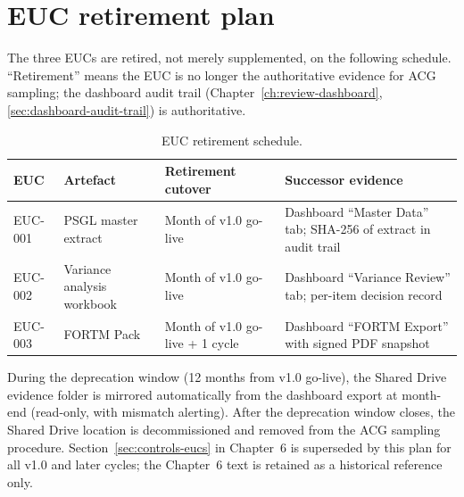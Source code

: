 \section{EUC retirement plan}\label{sec:euc-retirement-plan}

The three EUCs are retired, not merely supplemented, on the
following schedule. ``Retirement'' means the EUC is no longer the
authoritative evidence for ACG sampling; the dashboard audit trail
(Chapter~\ref{ch:review-dashboard}, \cref{sec:dashboard-audit-trail}) is authoritative.

\begin{table}[htbp]
\centering
\caption{EUC retirement schedule.}
\label{tab:euc-retirement}
\footnotesize
\begin{tabularx}{\linewidth}{@{}l l l X@{}}
\toprule
\textbf{EUC} & \textbf{Artefact} & \textbf{Retirement cutover} & \textbf{Successor evidence} \\ \midrule
EUC-001 & PSGL master extract & Month of v1.0 go-live & Dashboard ``Master Data'' tab; SHA-256 of extract in audit trail \\
EUC-002 & Variance analysis workbook & Month of v1.0 go-live & Dashboard ``Variance Review'' tab; per-item decision record \\
EUC-003 & FORTM Pack & Month of v1.0 go-live + 1 cycle & Dashboard ``FORTM Export'' with signed PDF snapshot \\
\bottomrule
\end{tabularx}
\end{table}

\noindent
During the deprecation window (12 months from v1.0 go-live), the
Shared Drive evidence folder is mirrored automatically from the
dashboard export at month-end (read-only, with mismatch alerting).
After the deprecation window closes, the Shared Drive location is
decommissioned and removed from the ACG sampling procedure.
Section~\ref{sec:controls-eucs} in Chapter~6 is superseded by this
plan for all v1.0 and later cycles; the Chapter~6 text is retained
as a historical reference only.
